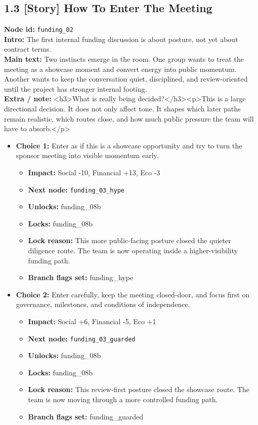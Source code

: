 \documentclass[11pt]{article}
\begin{document}
\subsection*{1.3 [Story] How To Enter The Meeting}
\textbf{Node id:} \texttt{funding\_02}\\
\textbf{Intro:} The first internal funding discussion is about posture, not yet about contract terms.\\
\textbf{Main text:} Two instincts emerge in the room. One group wants to treat the meeting as a showcase moment and convert energy into public momentum. Another wants to keep the conversation quiet, disciplined, and review-oriented until the project has stronger internal footing.\\
\textbf{Extra / note:} <h3>What is really being decided?</h3><p>This is a large directional decision. It does not only affect tone. It shapes which later paths remain realistic, which routes close, and how much public pressure the team will have to absorb.</p>\\
\begin{itemize}
\item \textbf{Choice 1:} Enter as if this is a showcase opportunity and try to turn the sponsor meeting into visible momentum early.
\begin{itemize}
\item \textbf{Impact:} Social -10, Financial +13, Eco -3
\item \textbf{Next node:} \texttt{funding\_03\_hype}
\item \textbf{Unlocks:} funding\_08b
\item \textbf{Locks:} funding\_08b
\item \textbf{Lock reason:} This more public-facing posture closed the quieter diligence route. The team is now operating inside a higher-visibility funding path.
\item \textbf{Branch flags set:} funding\_hype
\end{itemize}
\item \textbf{Choice 2:} Enter carefully, keep the meeting closed-door, and focus first on governance, milestones, and conditions of independence.
\begin{itemize}
\item \textbf{Impact:} Social +6, Financial -5, Eco +1
\item \textbf{Next node:} \texttt{funding\_03\_guarded}
\item \textbf{Unlocks:} funding\_08b
\item \textbf{Locks:} funding\_08b
\item \textbf{Lock reason:} This review-first posture closed the showcase route. The team is now moving through a more controlled funding path.
\item \textbf{Branch flags set:} funding\_guarded
\end{itemize}
\end{itemize}
\end{document}
